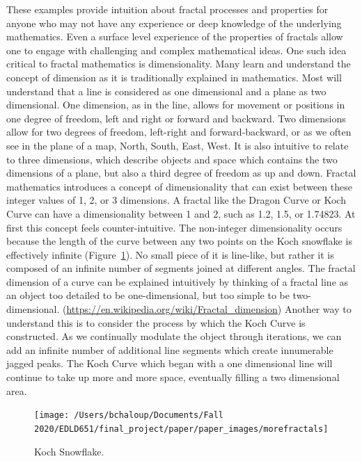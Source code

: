 \documentclass[english,jou]{apa6}
\begin{document}
These examples provide intuition about fractal processes and properties for anyone who may not have any experience or deep knowledge of the underlying mathematics. Even a surface level experience of the properties of fractals allow one to engage with challenging and complex mathematical ideas. One such idea critical to fractal mathematics is dimensionality. Many learn and understand the concept of dimension as it is traditionally explained in mathematics. Most will understand that a line is considered as one dimensional and a plane as two dimensional. One dimension, as in the line, allows for movement or positions in one degree of freedom, left and right or forward and backward. Two dimensions allow for two degrees of freedom, left-right and forward-backward, or as we often see in the plane of a map, North, South, East, West. It is also intuitive to relate to three dimensions, which describe objects and space which contains the two dimensions of a plane, but also a third degree of freedom as up and down. Fractal mathematics introduces a concept of dimensionality that can exist between these integer values of 1, 2, or 3 dimensions. A fractal like the Dragon Curve or Koch Curve can have a dimensionality between 1 and 2, such as 1.2, 1.5, or 1.74823. At first this concept feels counter-intuitive. The non-integer dimensionality occurs because the length of the curve between any two points on the Koch snowflake is effectively infinite (Figure~\ref{fig:snowflake}). No small piece of it is line-like, but rather it is composed of an infinite number of segments joined at different angles. The fractal dimension of a curve can be explained intuitively by thinking of a fractal line as an object too detailed to be one-dimensional, but too simple to be two-dimensional. (\url{https://en.wikipedia.org/wiki/Fractal_dimension}) Another way to understand this is to consider the process by which the Koch Curve is constructed. As we continually modulate the object through iterations, we can add an infinite number of additional line segments which create innumerable jagged peaks. The Koch Curve which began with a one dimensional line will continue to take up more and more space, eventually filling a two dimensional area.

\begin{figure}

{\centering \texttt{[image: /Users/bchaloup/Documents/Fall 2020/EDLD651/final\_project/paper/paper\_images/morefractals]} 

}

\caption{Koch Snowflake.}\label{fig:snowflake}
\end{figure}
\end{document}
